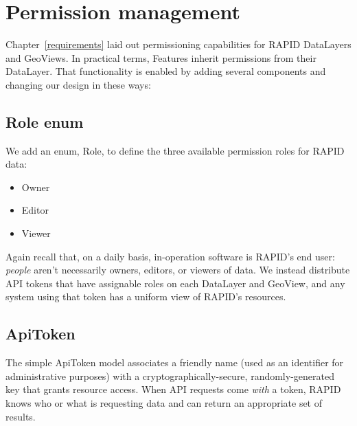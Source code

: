 




\section{Permission management}
Chapter~\ref{requirements} laid out permissioning capabilities for RAPID DataLayers and GeoViews. In practical terms, Features inherit permissions from their DataLayer. That functionality is enabled by adding several components and changing our design in these ways:

\subsection{Role enum}
We add an enum, Role, to define the three available permission roles for RAPID data:
\begin{itemize}

  \item Owner
  \item Editor 
  \item Viewer
  \end{itemize}

Again recall that, on a daily basis, in-operation software is RAPID's end user: \textit{people} aren't necessarily owners, editors, or viewers of data. We instead distribute API tokens that have assignable roles on each DataLayer and GeoView, and any system using that token has a uniform view of RAPID's resources.

\subsection{ApiToken}
The simple ApiToken model associates a friendly name (used as an identifier for administrative purposes) with a cryptographically-secure, randomly-generated key that grants resource access. When API requests come \textit{with} a token, RAPID knows who or what is requesting data and can return an appropriate set of results.


